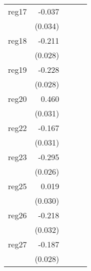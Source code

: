 {\begin{longtable}{l*{4}{D{.}{.}{-1}}}
\addlinespace
reg17       &      -0.037         &                     &                     &                     \\
            &     (0.034)         &                     &                     &                     \\
\addlinespace
reg18       &      -0.211\sym{***}&                     &                     &                     \\
            &     (0.028)         &                     &                     &                     \\
\addlinespace
reg19       &      -0.228\sym{***}&                     &                     &                     \\
            &     (0.028)         &                     &                     &                     \\
\addlinespace
reg20       &       0.460\sym{***}&                     &                     &                     \\
            &     (0.031)         &                     &                     &                     \\
\addlinespace
reg22       &      -0.167\sym{***}&                     &                     &                     \\
            &     (0.031)         &                     &                     &                     \\
\addlinespace
reg23       &      -0.295\sym{***}&                     &                     &                     \\
            &     (0.026)         &                     &                     &                     \\
\addlinespace
reg25       &       0.019         &                     &                     &                     \\
            &     (0.030)         &                     &                     &                     \\
\addlinespace
reg26       &      -0.218\sym{***}&                     &                     &                     \\
            &     (0.032)         &                     &                     &                     \\
\addlinespace
reg27       &      -0.187\sym{***}&                     &                     &                     \\
            &     (0.028)         &                     &                     &                     \\

\end{longtable}}

